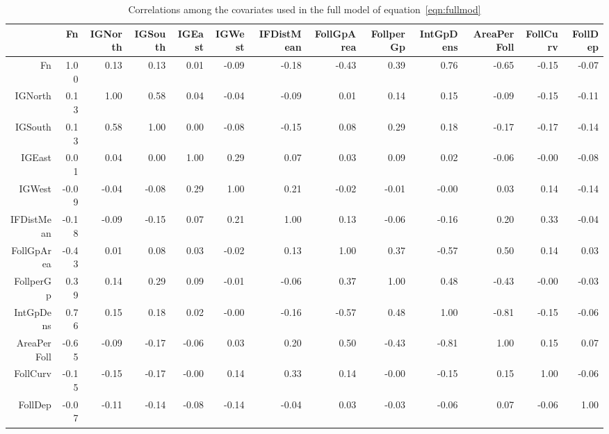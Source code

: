 \begin{landscape}
\begin{table}[ht]
\footnotesize
\centering
\caption{Correlations among the covariates used in the full model of equation~\ref{eqn:fullmod}}
\label{tab:covcor}
\begin{tabular}{rrrrrrrrrrrrr}
  \hline
 & Fn & IGNorth & IGSouth & IGEast & IGWest & IFDistMean & FollGpArea & FollperGp & IntGpDens & AreaPerFoll & FollCurv & FollDep \\ 
  \hline
Fn & 1.00 & 0.13 & 0.13 & 0.01 & -0.09 & -0.18 & -0.43 & 0.39 & 0.76 & -0.65 & -0.15 & -0.07 \\ 
  IGNorth & 0.13 & 1.00 & 0.58 & 0.04 & -0.04 & -0.09 & 0.01 & 0.14 & 0.15 & -0.09 & -0.15 & -0.11 \\ 
  IGSouth & 0.13 & 0.58 & 1.00 & 0.00 & -0.08 & -0.15 & 0.08 & 0.29 & 0.18 & -0.17 & -0.17 & -0.14 \\ 
  IGEast & 0.01 & 0.04 & 0.00 & 1.00 & 0.29 & 0.07 & 0.03 & 0.09 & 0.02 & -0.06 & -0.00 & -0.08 \\ 
  IGWest & -0.09 & -0.04 & -0.08 & 0.29 & 1.00 & 0.21 & -0.02 & -0.01 & -0.00 & 0.03 & 0.14 & -0.14 \\ 
  IFDistMean & -0.18 & -0.09 & -0.15 & 0.07 & 0.21 & 1.00 & 0.13 & -0.06 & -0.16 & 0.20 & 0.33 & -0.04 \\ 
  FollGpArea & -0.43 & 0.01 & 0.08 & 0.03 & -0.02 & 0.13 & 1.00 & 0.37 & -0.57 & 0.50 & 0.14 & 0.03 \\ 
  FollperGp & 0.39 & 0.14 & 0.29 & 0.09 & -0.01 & -0.06 & 0.37 & 1.00 & 0.48 & -0.43 & -0.00 & -0.03 \\ 
  IntGpDens & 0.76 & 0.15 & 0.18 & 0.02 & -0.00 & -0.16 & -0.57 & 0.48 & 1.00 & -0.81 & -0.15 & -0.06 \\ 
  AreaPerFoll & -0.65 & -0.09 & -0.17 & -0.06 & 0.03 & 0.20 & 0.50 & -0.43 & -0.81 & 1.00 & 0.15 & 0.07 \\ 
  FollCurv & -0.15 & -0.15 & -0.17 & -0.00 & 0.14 & 0.33 & 0.14 & -0.00 & -0.15 & 0.15 & 1.00 & -0.06 \\ 
  FollDep & -0.07 & -0.11 & -0.14 & -0.08 & -0.14 & -0.04 & 0.03 & -0.03 & -0.06 & 0.07 & -0.06 & 1.00 \\ 
   \hline
\end{tabular}
\end{table}
\end{landscape}
